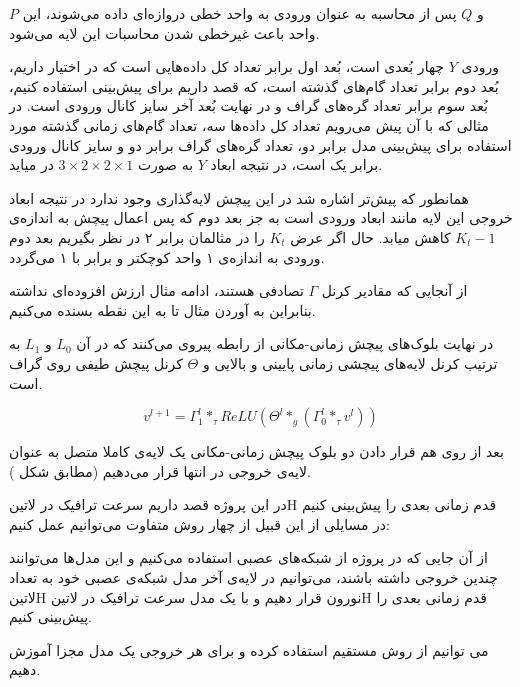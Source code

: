  $P$ و $Q$ پس از محاسبه به عنوان ورودی به واحد خطی دروازه‌ای داده می‌شوند، این واحد باعث غیرخطی شدن محاسبات این لایه می‌شود.

ورودی $Y$ چهار بُعدی است، بُعد اول برابر تعداد کل داده‌هایی است که در اختیار داریم، بُعد دوم برابر
تعداد گام‌های گذشته است، که قصد داریم برای پیش‌بینی استفاده کنیم،
بُعد سوم برابر تعداد گره‌های گراف و در نهایت بُعد آخر سایز کانال ورودی است.
در مثالی که با آن پیش می‌رویم تعداد کل داده‌ها سه، تعداد گام‌های زمانی گذشته مورد استفاده برای پیش‌بینی مدل برابر دو،
تعداد گره‌های گراف برابر دو و سایز کانال ورودی برابر یک است، در نتیجه ابعاد $Y$ به صورت $ 3 \times 2 \times 2 \times 1 $ در میاید.

همانطور که پیش‌تر اشاره شد در این پیچش لایه‌گذاری وجود ندارد در نتیجه ابعاد خروجی این لایه مانند ابعاد ورودی است به جز بعد دوم
که پس اعمال پیچش به اندازه‌ی $K_{t}-1$ کاهش میابد. حال اگر عرض $K_{t}$ را در مثالمان برابر ۲ در نظر بگیریم
بعد دوم ورودی به اندازه‌ی ۱ واحد کوچکتر و برابر با ۱ می‌گردد.

از آنجایی که مقادیر کرنل $\Gamma$ تصادفی هستند، ادامه مثال ارزش افزوده‌ای نداشته بنابراین به آوردن مثال تا به این نقطه بسنده می‌کنیم.

در نهایت بلوک‌های پیچش زمانی-مکانی از رابطه  پیروی می‌کنند که در آن $L_{0}$ و $L_{1}$ به ترتیب کرنل‌ لایه‌های پیچشی زمانی پایینی و بالایی و $\Theta$ کرنل پیچش طیفی روی گراف است.

\begin{equation}
v^{{l+1}} = \Gamma^{l}_{1} *_{\tau} ReLU( \Theta^{l} *_{g} (\Gamma_{0}^{l} *_{\tau} v^{l}) )
  \label{eq:blocks}
\end{equation}

بعد از روی هم قرار دادن دو بلوک پیچش زمانی-مکانی یک لایه‌ی کاملا متصل به عنوان لایه‌ی خروجی در انتها قرار می‌دهیم (مطابق شکل ).


در این پروژه قصد داریم سرعت ترافیک در ‌لاتین{H} قدم زمانی بعدی را پیش‌بینی کنیم در مسایلی از این قبیل از چهار روش متفاوت می‌توانیم عمل کنیم:


 از آن جایی که در پروژه از شبکه‌های عصبی استفاده می‌کنیم و این مدل‌ها می‌توانند چندین خروجی داشته باشند، می‌توانیم در لایه‌ی آخر مدل شبکه‌ی عصبی خود به تعداد ‌لاتین{H} نورون قرار دهیم و با یک مدل سرعت ترافیک در ‌لاتین{H} قدم زمانی بعدی را پیش‌بینی کنیم.

 می توانیم از روش مستقیم  استفاده کرده و برای هر خروجی یک مدل مجزا آموزش دهیم.

